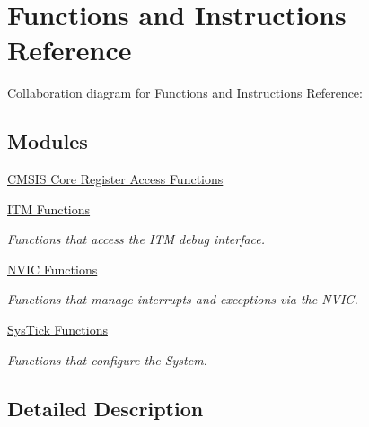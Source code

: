 \hypertarget{group__CMSIS__Core__FunctionInterface}{}\section{Functions and Instructions Reference}
\label{group__CMSIS__Core__FunctionInterface}
Collaboration diagram for Functions and Instructions Reference\+:
\subsection*{Modules}
\begin{DoxyCompactItemize}
\item 
\hyperlink{group__CMSIS__Core__RegAccFunctions}{C\+M\+S\+I\+S Core Register Access Functions}
\item 
\hyperlink{group__CMSIS__core__DebugFunctions}{I\+T\+M Functions}
\begin{DoxyCompactList}\small\item\em Functions that access the I\+TM debug interface. \end{DoxyCompactList}\item 
\hyperlink{group__CMSIS__Core__NVICFunctions}{N\+V\+I\+C Functions}
\begin{DoxyCompactList}\small\item\em Functions that manage interrupts and exceptions via the N\+V\+IC. \end{DoxyCompactList}\item 
\hyperlink{group__CMSIS__Core__SysTickFunctions}{Sys\+Tick Functions}
\begin{DoxyCompactList}\small\item\em Functions that configure the System. \end{DoxyCompactList}\end{DoxyCompactItemize}


\subsection{Detailed Description}
